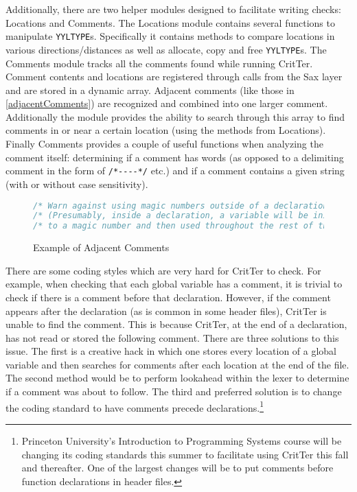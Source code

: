 \documentclass[12pt]{report}
\newcommand{\programName}{CritTer\xspace}
\begin{document}
Additionally, there are two helper modules designed to facilitate writing checks: Locations and 
Comments. The Locations module contains several functions to manipulate \lstinline{YYLTYPE}s.  
Specifically it contains methods to compare locations in various directions\slash distances as well as 
allocate, copy and free \lstinline{YYLTYPE}s. The Comments module tracks all the comments found 
while running \programName. Comment contents and locations are registered through calls from the 
Sax layer and are stored in a dynamic array. Adjacent comments (like those in 
\autoref{adjacentComments}) are recognized and combined into one larger comment. Additionally the 
module provides the ability to search through this array to find comments in or near a certain location 
(using the methods from Locations). Finally Comments provides a couple of useful functions when 
analyzing the comment itself: determining if a comment has words (as opposed to a delimiting comment 
in the form of \lstinline{/*----*/} etc.) and if a comment contains a given string (with or without case 
sensitivity).

\begin{figure}
\begin{lstlisting}[language=C]
/* Warn against using magic numbers outside of a declaration.        */
/* (Presumably, inside a declaration, a variable will be initialized */
/* to a magic number and then used throughout the rest of the code). */
\end{lstlisting}
\caption{Example of Adjacent Comments}
\label{adjacentComments}
\end{figure}

There are some coding styles which are very hard for \programName to check. For example, when 
checking that each global variable has a comment, it is trivial to check if there is a comment before that 
declaration. However, if the comment appears after the declaration (as is common in some header 
files), \programName is unable to find the comment. This is because \programName, at the end of a 
declaration, has not read or stored the following comment. There are three solutions to this issue. The 
first is a creative hack in which one stores every location of a global variable and then searches for 
comments after each location at the end of the file. The second method would be to perform lookahead 
within the lexer to determine if a comment was about to follow. The third and preferred solution is to 
change the coding standard to have comments precede declarations.\footnote{Princeton University's 
Introduction to Programming Systems course\cite{cos217} will be changing its coding standards this 
summer to facilitate using \programName this fall and thereafter. One of the largest changes will be to put 
comments before function declarations in header files.}
\end{document}
